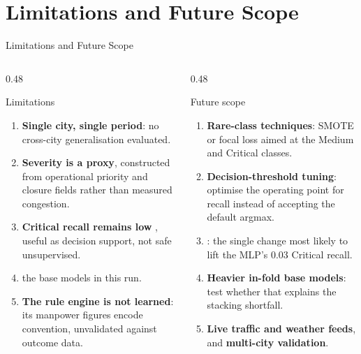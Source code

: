 \section{Limitations and Future Scope}

\begin{frame}{Limitations and Future Scope}
  \begin{columns}[T]
    \begin{column}{0.48\textwidth}
      \begin{alertblock}{Limitations}
        \small
        \begin{enumerate}
          \item \textbf{Single city, single period}: no cross-city
                generalisation evaluated.
          \item \textbf{Severity is a proxy}, constructed from operational
                priority and closure fields rather than measured congestion.
          \item \textbf{Critical recall remains low} , useful
                as decision support, not safe unsupervised.
          \item {} the base models in this run.
          \item \textbf{The rule engine is not learned}: its manpower figures
                encode convention, unvalidated against outcome data.
        \end{enumerate}
      \end{alertblock}
    \end{column}
    \begin{column}{0.48\textwidth}
      \begin{exampleblock}{Future scope}
        \small
        \begin{enumerate}
          \item \textbf{Rare-class techniques}: SMOTE or focal loss aimed at
                the Medium and Critical classes.
          \item \textbf{Decision-threshold tuning}: optimise the operating
                point for recall instead of accepting the default argmax.
          \item {}: the single
                change most likely to lift the MLP's 0.03 Critical recall.
          \item \textbf{Heavier in-fold base models}: test whether that
                explains the stacking shortfall.
          \item \textbf{Live traffic and weather feeds}, and \textbf{multi-city
                validation}.
        \end{enumerate}
      \end{exampleblock}
    \end{column}
  \end{columns}
\end{frame}
